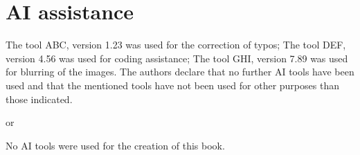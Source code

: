 \addchap{\lsPrefaceTitle}
\markdouble{\lsPrefaceTitle}
 


\section*{AI assistance}
The tool ABC, version 1.23 was used for the correction of typos;
The tool DEF, version 4.56 was used for coding assistance;
The tool GHI, version 7.89 was used for blurring of the images.
The authors declare that no further AI tools have been used and that the mentioned tools have not been used for other purposes than those indicated.

or

No AI tools were used for the creation of this book.
